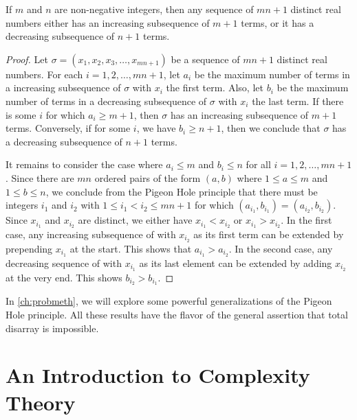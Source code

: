 \begin{theorem}\label{thm:ErdosSzekeres}
If $m$ and $n$ are non-negative integers, then 
any sequence of $mn+1$ distinct real numbers 
either has an increasing subsequence of $m+1$ terms, or it has a 
decreasing subsequence of $n+1$ terms.
\end{theorem}
\begin{proof}
Let $\sigma=(x_1,x_2,x_3,\dots,x_{mn+1})$ be a sequence of
$mn+1$ distinct real numbers.  For each $i=1,2,\dots,mn+1$, let $a_i$ be the
maximum number of terms in a increasing subsequence of
$\sigma$ with $x_i$ the first term.  Also, let $b_i$ be the maximum number
of terms in a decreasing subsequence of $\sigma$ with $x_i$
the last term.  If there is some $i$ for which $a_i\ge m+1$, then
$\sigma$ has an increasing subsequence of $m+1$ terms.  Conversely, if
for some $i$, we have $b_i\ge n+1$, then we conclude that $\sigma$ has
a decreasing subsequence of $n+1$ terms.

It remains to consider the case where $a_i\le m$ and $b_i\le n$ for all
$i=1,2,\dots,mn+1$.  Since there are $mn$ ordered pairs of the form
$(a,b)$ where $1\le a\le m$ and $1\le b\le n$, we conclude from the
Pigeon Hole principle that there must be integers $i_1$ and $i_2$ with
$1\le i_1<i_2\le mn+1$ for which $(a_{i_1},b_{i_1})=(a_{i_2},b_{i_2})$.
Since $x_{i_1}$ and $x_{i_2}$ are distinct, we either have $x_{i_1}<x_{i_2}$
or $x_{i_1}>x_{i_2}$.  In the first case, any increasing subsequence of 
with $x_{i_2}$ as its first term can be extended by prepending
$x_{i_1}$ at the start.  This shows that $a_{i_1}>a_{i_2}$.  
In the second case, any decreasing sequence of with $x_{i_1}$ as its last 
element can be extended by adding $x_{i_2}$ at the very end.  This
shows $b_{i_2}>b_{i_1}$.
\end{proof}

In \autoref{ch:probmeth}, we will explore some powerful
generalizations of the Pigeon Hole principle.  All these results have
the flavor of the general assertion that total disarray is impossible.

\section{An Introduction to Complexity Theory}


